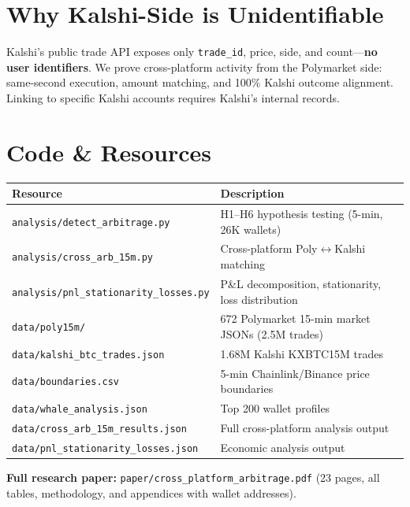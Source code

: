 \documentclass[11pt,a4paper]{article}
\begin{document}
\section*{Why Kalshi-Side is Unidentifiable}

Kalshi's public trade API exposes only \texttt{trade\_id}, price, side, and count---\textbf{no user identifiers}. We prove cross-platform activity from the Polymarket side: same-second execution, amount matching, and 100\% Kalshi outcome alignment. Linking to specific Kalshi accounts requires Kalshi's internal records.

\section*{Code \& Resources}

\footnotesize
\begin{tabular}{@{}lp{9cm}@{}}
\toprule
\textbf{Resource} & \textbf{Description} \\
\midrule
\texttt{analysis/detect\_arbitrage.py} & H1--H6 hypothesis testing (5-min, 26K wallets) \\
\texttt{analysis/cross\_arb\_15m.py} & Cross-platform Poly$\leftrightarrow$Kalshi matching \\
\texttt{analysis/pnl\_stationarity\_losses.py} & P\&L decomposition, stationarity, loss distribution \\
\texttt{data/poly15m/} & 672 Polymarket 15-min market JSONs (2.5M trades) \\
\texttt{data/kalshi\_btc\_trades.json} & 1.68M Kalshi KXBTC15M trades \\
\texttt{data/boundaries.csv} & 5-min Chainlink/Binance price boundaries \\
\texttt{data/whale\_analysis.json} & Top 200 wallet profiles \\
\texttt{data/cross\_arb\_15m\_results.json} & Full cross-platform analysis output \\
\texttt{data/pnl\_stationarity\_losses.json} & Economic analysis output \\
\bottomrule
\end{tabular}
\normalsize

\bigskip
\noindent\textbf{Full research paper:} \texttt{paper/cross\_platform\_arbitrage.pdf} (23 pages, all tables, methodology, and appendices with wallet addresses).
\end{document}
